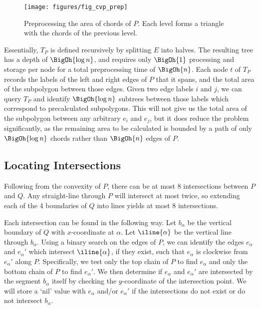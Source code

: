 \begin{figure}[t]
\begin{center}
  \texttt{[image: figures/fig\_cvp\_prep]}
  \caption[Preprocessing the area of chords of $P$.]{Preprocessing the area of chords of $P$.  Each level forms a triangle with the chords of the previous level.}
  \label{fig:convexp:preprocessing}
\end{center}
\end{figure}

Essentially, $T_P$ is defined recursively by splitting $E$ into halves. 
The resulting tree has a depth of $\BigOh{\log{n}}$, and requires only $\BigOh{1}$ processing and storage per node for a total preprocessing time of $\BigOh{n}$. 
Each node $t$ of $T_P$ records the labels of the left and right edges of $P$ that it spans, and the total area of the subpolygon between those edges.
Given two edge labels $i$ and $j$, we can query $T_P$ and identify $\BigOh{\log{n}}$ subtrees between those labels which correspond to precalculated subpolygons.
This will not give us the total area of the subpolygon between any arbitrary $e_i$ and $e_j$, but it does reduce the problem significantly, as the remaining area to be calculated is bounded by a path of only $\BigOh{\log{n}}$ chords rather than $\BigOh{n}$ edges of $P$.


\subsection{Locating Intersections}
\label{:convexp:intersections}

Following from the convexity of $P$, there can be at most $8$ intersections between $P$ and $Q$. 
Any straight-line through $P$ will intersect at most twice, so extending each of the 4 boundaries of $Q$ into lines yields at most 8 intersections.

Each intersection can be found in the following way. 
Let $b_\alpha$ be the vertical boundary of $Q$ with $x$-coordinate at $\alpha$. 
Let $\iline{\alpha}$ be the vertical line through $b_\alpha$. 
Using a binary search on the edges of $P$, we can identify the edges $e_\alpha$ and $e_\alpha'$ which intersect $\iline{\alpha}$, if they exist, such that $e_\alpha$ is clockwise from $e_\alpha'$ along $P$.
Specifically, we test only the top chain of $P$ to find $e_\alpha$ and only the bottom chain of $P$ to find $e_\alpha'$.
We then determine if $e_\alpha$ and $e_\alpha'$ are intersected by the segment $b_\alpha$ itself by checking the $y$-coordinate of the intersection point. 
We will store a `nil' value with $e_\alpha$ and/or $e_\alpha'$ if the intersections do not exist or do not intersect $b_\alpha$.

